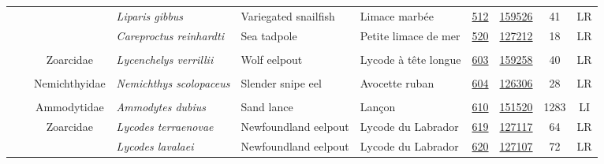 \documentclass[12pt]{article}\usepackage[]{graphicx}\usepackage[]{color}
\begin{document}
\begin{landscapepage}
\begin{longtable}[t]{ccc>{\centering\arraybackslash}p{3cm}>{\centering\arraybackslash}p{3cm}>{\centering\arraybackslash}p{3cm}>{}c>{}ccc}
\nopagebreak
\hspace{1em}\hspace{1em} &  &  & \em{Liparis gibbus} & Variegated snailfish & Limace marbée & \href{#sec:512}{512} & \href{http://www.marinespecies.org/aphia.php?p=taxdetails&id=159526}{159526} & 41 & LR\\
\nopagebreak
\hspace{1em}\hspace{1em} &  &  & \em{Careproctus reinhardti} & Sea tadpole & Petite limace de mer & \href{#sec:520}{520} & \href{http://www.marinespecies.org/aphia.php?p=taxdetails&id=127212}{127212} & 18 & LR\\
\nopagebreak
\addlinespace[0.3em]
\\
\hspace{1em}\hspace{1em} &  & Zoarcidae & \em{Lycenchelys verrillii} & Wolf eelpout & Lycode à tête longue & \href{#sec:603}{603} & \href{http://www.marinespecies.org/aphia.php?p=taxdetails&id=159258}{159258} & 40 & LR\\
\nopagebreak
\addlinespace[0.3em]
\\
\hspace{1em}\hspace{1em} &  & Nemichthyidae & \em{Nemichthys scolopaceus} & Slender snipe eel & Avocette ruban & \href{#sec:604}{604} & \href{http://www.marinespecies.org/aphia.php?p=taxdetails&id=126306}{126306} & 28 & LR\\
\nopagebreak
\addlinespace[0.3em]
\\
\hspace{1em}\hspace{1em} &  & Ammodytidae & \em{Ammodytes dubius} & Sand lance & Lançon & \href{#sec:610}{610} & \href{http://www.marinespecies.org/aphia.php?p=taxdetails&id=151520}{151520} & 1283 & LI\\
\nopagebreak
\hspace{1em}\hspace{1em} &  & Zoarcidae & \em{Lycodes terraenovae} & Newfoundland eelpout & Lycode du Labrador & \href{#sec:619}{619} & \href{http://www.marinespecies.org/aphia.php?p=taxdetails&id=127117}{127117} & 64 & LR\\
\nopagebreak
\hspace{1em}\hspace{1em} &  &  & \em{Lycodes lavalaei} & Newfoundland eelpout & Lycode du Labrador & \href{#sec:620}{620} & \href{http://www.marinespecies.org/aphia.php?p=taxdetails&id=127107}{127107} & 72 & LR\\

\end{longtable}
\end{landscapepage}
\end{document}
